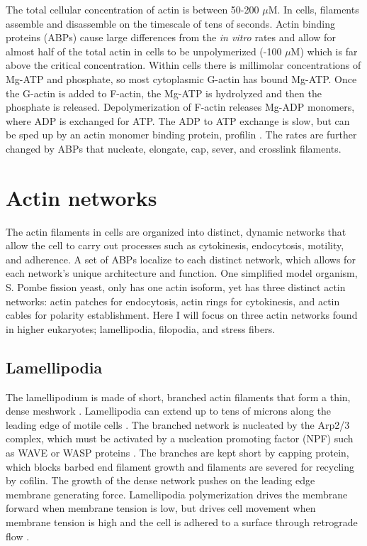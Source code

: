 The total cellular concentration of actin is between 50-200 $\mu$M. In cells, filaments assemble and disassemble on the timescale of tens of seconds. Actin binding proteins (ABPs) cause large differences from the \textit{in vitro} rates and allow for almost half of the total actin in cells to be unpolymerized (-100 $\mu$M) which is far above the critical concentration. Within cells there is millimolar concentrations of Mg-ATP and phosphate, so most cytoplasmic G-actin has bound Mg-ATP. Once the G-actin is added to F-actin, the Mg-ATP is hydrolyzed and then the phosphate is released. Depolymerization of F-actin releases Mg-ADP monomers, where ADP is exchanged for ATP. The ADP to ATP exchange is slow, but can be sped up by an actin monomer binding protein, profilin \citep{pollard_actin_2016}. The rates are further changed by ABPs that nucleate, elongate, cap, sever, and crosslink filaments. 

\section{Actin networks}\label{network-intro}
The actin filaments in cells are organized into distinct, dynamic networks that allow the cell to carry out processes such as cytokinesis, endocytosis, motility, and adherence. A set of ABPs localize to each distinct network, which allows for each network's unique architecture and function. One simplified model organism, S. Pombe fission yeast, only has one actin isoform, yet has three distinct actin networks: actin patches for endocytosis, actin rings for cytokinesis, and actin cables for polarity establishment. Here I will focus on three actin networks found in higher eukaryotes; lamellipodia, filopodia, and stress fibers. 

\subsection{Lamellipodia}\label{lamellipodia-intro}
The lamellipodium is made of short, branched actin filaments that form a thin, dense meshwork \citep{small_lamellipodium:_2002}. Lamellipodia can extend up to tens of microns along the leading edge of motile cells \citep{skau_specification_2015}. The branched network is nucleated by the Arp2/3 complex, which must be activated by a nucleation promoting factor (NPF) such as WAVE or WASP proteins \citep{blanchoin_actin_2014}. The branches are kept short by capping protein, which blocks barbed end filament growth and filaments are severed for recycling by cofilin. The growth of the dense network pushes on the leading edge membrane generating force. Lamellipodia polymerization drives the membrane forward when membrane tension is low, but drives cell movement when membrane tension is high and the cell is adhered to a surface through retrograde flow \citep{skau_specification_2015}.  

